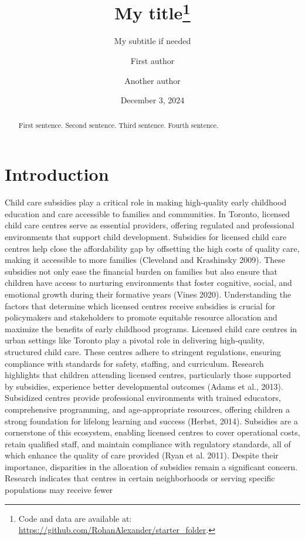\documentclass[
  letterpaper,
  DIV=11,
  numbers=noendperiod]{scrartcl}
\title{My title\thanks{Code and data are available at:
\url{https://github.com/RohanAlexander/starter_folder}.}}
\subtitle{My subtitle if needed}
\author{First author \and Another author}
\date{December 3, 2024}
\begin{document}
\maketitle
\begin{abstract}
First sentence. Second sentence. Third sentence. Fourth sentence.
\end{abstract}


\section{Introduction}\label{introduction}

Child care subsidies play a critical role in making high-quality early
childhood education and care accessible to families and communities. In
Toronto, licensed child care centres serve as essential providers,
offering regulated and professional environments that support child
development. Subsidies for licensed child care centres help close the
affordability gap by offsetting the high costs of quality care, making
it accessible to more families (Cleveland and Krashinsky 2009). These
subsidies not only ease the financial burden on families but also ensure
that children have access to nurturing environments that foster
cognitive, social, and emotional growth during their formative years
(Vines 2020). Understanding the factors that determine which licensed
centres receive subsidies is crucial for policymakers and stakeholders
to promote equitable resource allocation and maximize the benefits of
early childhood programs. Licensed child care centres in urban settings
like Toronto play a pivotal role in delivering high-quality, structured
child care. These centres adhere to stringent regulations, ensuring
compliance with standards for safety, staffing, and curriculum. Research
highlights that children attending licensed centres, particularly those
supported by subsidies, experience better developmental outcomes (Adams
et al., 2013). Subsidized centres provide professional environments with
trained educators, comprehensive programming, and age-appropriate
resources, offering children a strong foundation for lifelong learning
and success (Herbst, 2014). Subsidies are a cornerstone of this
ecosystem, enabling licensed centres to cover operational costs, retain
qualified staff, and maintain compliance with regulatory standards, all
of which enhance the quality of care provided (Ryan et al. 2011).
Despite their importance, disparities in the allocation of subsidies
remain a significant concern. Research indicates that centres in certain
neighborhoods or serving specific populations may receive fewer
\end{document}
